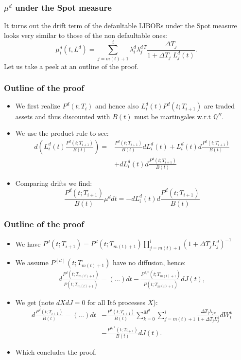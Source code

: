 \documentclass{beamer}
\begin{document}
	\begin{frame}
	\frametitle{$\mu^d$ under the Spot measure}
	It turns out the drift term of the defaultable LIBORs under the Spot measure looks very similar to those of the non defaultable ones:
	\[
	\mu^d_i(t, L^d) = \sum_{j=m\left( t\right)  + 1}^{i} \lambda^d_{i}\lambda^{d \, T}_{j}  \frac{\Delta T_j}{1 + \Delta T_j \; L^d_j(t)}.
	\]
	Let us take a peek at an outline of the proof.
	\end{frame}
	
	\begin{frame}
		\frametitle{Outline of the proof}
		
		\begin{itemize}
			\item We first realize $P^d(t; T_i)$ and hence also $L^d_i(t) P^d(t;T_{i+1})$ are traded assets and thus discounted with $B(t)$ must be martingales w.r.t $\mathbb{Q}^B$.
			\item We use the product rule to see:
			\begin{align*}
			d(L^d_i(t)\frac{P^d(t;T_{i+1})}{B(t)}) = &\frac{P^d(t;T_{i+1})}{B(t)} dL^d_i(t) + L^d_i(t) d\frac{P^d(t;T_{i+1})}{B(t)}\\
			& + dL^d_i(t) d\frac{P^d(t;T_{i+1})}{B(t)}
			\end{align*}
			\item Comparing drifts we find:
			\[\frac{P^d(t;T_{i+1})}{B(t)} \mu^d dt = -dL^d_i(t) d\frac{P^d(t;T_{i+1})}{B(t)}\]
		\end{itemize}
		
	\end{frame}
	
	\begin{frame}
		\frametitle{Outline of the proof}
		\begin{itemize}
			\item We have
			\(
				P^d(t;T_{i+1}) = P^d(t;T_{m(t)+1}) \prod_{j=m\left( t\right) + 1}^{i}(1 + \Delta T_j L^d_{j})^{-1}
			\)
			\item We assume $P^{(d)}(t; T_{m(t)+1})$ have no diffusion, hence:
			\begin{align*}
				d\frac{P^d(t;T_{m(t)+1})}{P(t;T_{m(t)+1})} = (...)dt - \frac{P^{d,*}(t;T_{m(t)+1})}{P(t;T_{m(t)+1})}dJ(t),
			\end{align*}
			\item We get (note $dX dJ = 0$ for all Itô processes $X$):
			\begin{align*}
				d\frac{P^d(t;T_{i+1})}{B(t)} = (...) dt &- \frac{P^d(t;T_{i+1})}{B(t)} \sum_{k=0}^{M^d}\sum_{j=m(t)+1}^{i}\frac{\Delta T_j \lambda_{j \, k}}{1+\Delta T_j L^d_j} dW^k_t \\
				&- \frac{P^{d,*}(t;T_{i+1})}{B(t)}dJ(t).
			\end{align*}
			\item Which concludes the proof.
		\end{itemize}
		
	\end{frame}
	
\end{document}
